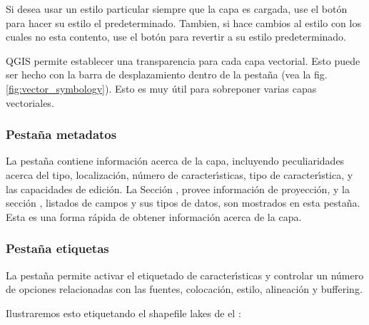 Si desea usar un estilo particular siempre que la capa es cargada, 
use el bot\'on  para hacer su estilo el predeterminado. Tambien, 
si hace cambios al estilo con los cuales no esta contento, use el bot\'on  para revertir a su estilo predeterminado.

 \label{sec:vect_transparency} 
QGIS \CURRENT permite establecer una transparencia para cada capa vectorial. Esto puede ser hecho con
la barra de desplazamiento  dentro de la pesta\~na  (vea la fig. \ref{fig:vector_symbology}).
Esto es muy \'util para sobreponer varias capas vectoriales.

\subsubsection{Pesta\~na metadatos}

La pesta\~na  contiene informaci\'on acerca de la capa, incluyendo peculiaridades
acerca del tipo, localizaci\'on, n\'umero de caracter\'{\i}sticas, tipo de caracter\'{\i}stica, y las capacidades de edici\'on.
La Secci\'on , provee 
informaci\'on de proyecci\'on, y la secci\'on ,
listados de campos y sus tipos de datos, son mostrados en esta pesta\~na. Esta es una forma r\'apida de obtener informaci\'on acerca de la capa.

\subsubsection{Pesta\~na etiquetas}

La pesta\~na  permite activar el etiquetado de caracter\'{\i}sticas y controlar un n\'umero de opciones
relacionadas con las fuentes, colocaci\'on, estilo, alineaci\'on y buffering.

Ilustraremos esto etiquetando el shapefile lakes de el 
:

